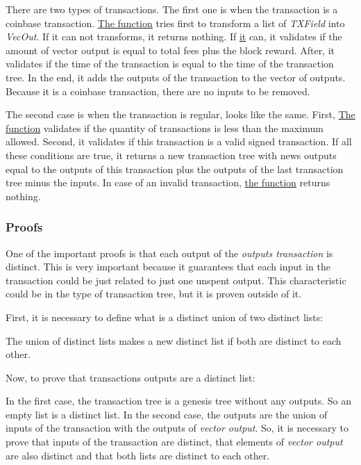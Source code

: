 
There are two types of transactions.
The first one is when the transaction is a coinbase transaction.
\hyperref[addtxtree1]{The function} tries first to transform a list of \emph{TXField} into \emph{VecOut}.
If it can not transforms, it returns nothing.
If \hyperref[addtxtree1]{it} can, it validates if the amount of vector output is
equal to total fees plus the block reward.
After, it validates if the time of the transaction is equal to the time of the transaction tree.
In the end, it adds the outputs of the transaction to the vector of outputs.
Because it is a coinbase transaction, there are no inputs to be removed.


The second case is when the transaction is regular, looks like the same.
First, \hyperref[addtxtree2]{The function} validates if the quantity of transactions is less
than the maximum allowed.
Second, it validates if this transaction is a valid signed transaction.
If all these conditions are true, it returns a new transaction tree
with news outputs equal to the outputs of this transaction plus the outputs of the last transaction tree
minus the inputs.
In case of an invalid transaction, \hyperref[addtxtree2]{the function} returns nothing.

\subsubsection{Proofs}

One of the important proofs is that each output of the \emph{outputs transaction} is distinct.
This is very important because it guarantees that each input in the transaction could be
just related to just one unspent output.
This characteristic could be in the type of transaction tree,
but it is proven outside of it.

First, it is necessary to define what is a distinct union of two distinct lists:


The union of distinct lists makes a new distinct list if both are distinct to each other.

Now, to prove that transactions outputs are a distinct list:


In the first case, the transaction tree is a genesis tree without any outputs.
So an empty list is a distinct list.
In the second case, the outputs are the union of inputs of the transaction with the outputs
of \emph{vector output}.
So, it is necessary to prove that inputs of the transaction are distinct,
that elements of \emph{vector output} are also distinct and that both lists are distinct to each other.

